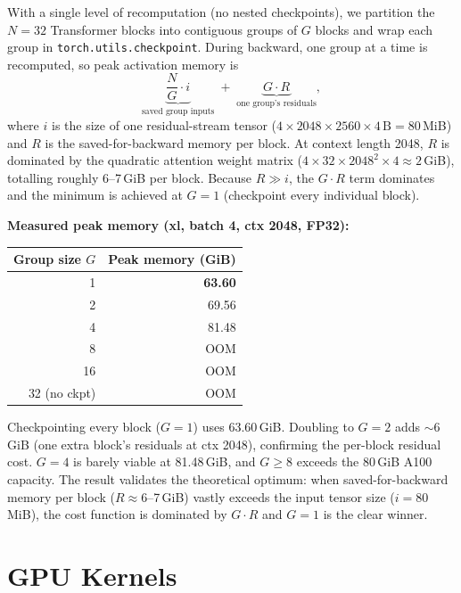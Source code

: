 \documentclass[11pt]{article}
\begin{document}
With a single level of recomputation (no nested checkpoints), we
partition the $N{=}32$ Transformer blocks into contiguous groups of $G$
blocks and wrap each group in \texttt{torch.utils.checkpoint}.  During
backward, one group at a time is recomputed, so peak activation memory
is
\[
  \underbrace{\frac{N}{G}\cdot i}_{\text{saved group inputs}}
  \;+\;
  \underbrace{G\cdot R}_{\text{one group's residuals}},
\]
where $i$ is the size of one residual-stream tensor
($4\times2048\times2560\times4\,\text{B}=80$\,MiB) and $R$ is the
saved-for-backward memory per block.  At context length 2048, $R$ is
dominated by the quadratic attention weight matrix
($4\times32\times2048^2\times4\approx2$\,GiB), totalling roughly
6--7\,GiB per block.  Because $R\gg i$, the $G\cdot R$ term dominates
and the minimum is achieved at \textbf{$G=1$} (checkpoint every
individual block).

\medskip\noindent\textbf{Measured peak memory (xl, batch 4, ctx 2048, FP32):}

\begin{center}
\begin{tabular}{r r}
\toprule
Group size $G$ & Peak memory (GiB) \\
\midrule
1  & \textbf{63.60} \\
2  & 69.56 \\
4  & 81.48 \\
8  & OOM \\
16 & OOM \\
32 (no ckpt) & OOM \\
\bottomrule
\end{tabular}
\end{center}

Checkpointing every block ($G{=}1$) uses 63.60\,GiB.  Doubling to
$G{=}2$ adds $\sim$6\,GiB (one extra block's residuals at ctx 2048),
confirming the per-block residual cost.  $G{=}4$ is barely viable at
81.48\,GiB, and $G{\geq}8$ exceeds the 80\,GiB A100 capacity.  The
result validates the theoretical optimum: when saved-for-backward
memory per block ($R\approx6$--7\,GiB) vastly exceeds the input tensor
size ($i{=}80$\,MiB), the cost function is dominated by $G\cdot R$
and $G{=}1$ is the clear winner.


\section{GPU Kernels}
\end{document}
